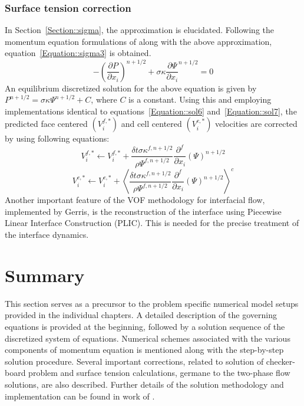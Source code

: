 \subsubsection{Surface tension correction}
In Section~\ref{Section::sigma}, the \citet{brackbill1992continuum} approximation is elucidated. Following the momentum equation formulations of \citet{renardy2002prost,francois2006balanced} along with the above approximation, equation~\ref{Equation::sigma3} is obtained.  
\begin{equation}\label{Equation::sigma3}
-\left(\frac{\partial P}{\partial x_i}\right)^{n+1/2} + \sigma\kappa\frac{\partial\Psi}{\partial x_i}^{n+1/2} = 0
\end{equation}
An equilibrium discretized solution for the above equation is given by $P^{n+1/2} = \sigma\kappa\Psi^{n+1/2} + C$, where $C$ is a constant. Using this and employing implementations identical to equations~\ref{Equation::sol6} and~\ref{Equation::sol7}, the predicted face centered $\left(V_i^{f,*}\right)$ and cell centered $\left(V_i^{c,*}\right)$ velocities are corrected by using following equations: 
\begin{equation}\label{Equation::sigma4}
V_i^{f,*} \leftarrow V_i^{f,*} + \frac{\delta t\sigma\kappa^{f,n+1/2}}{\rho\Psi^{f,n+1/2}}\frac{\partial^f}{\partial x_i}(\Psi)^{n+1/2}
\end{equation}
\begin{equation}\label{Equation::sigma5}
V_i^{c,*} \leftarrow V_i^{c,*} + \left\langle\frac{\delta t\sigma\kappa^{f,n+1/2}}{\rho\Psi^{f,n+1/2}}\frac{\partial^f}{\partial x_i}(\Psi)^{n+1/2}\right\rangle^c
\end{equation}
Another important feature of the VOF methodology for interfacial flow, implemented by Gerris, is the reconstruction of the interface using Piecewise Linear Interface Construction (PLIC). This is needed for the precise treatment of the interface dynamics.
\section{Summary}
This section serves as a precursor to the problem specific numerical model setups provided in the individual chapters. A detailed description of the governing equations is provided at the beginning, followed by a solution sequence of the discretized system of equations. Numerical schemes associated with the various components of momentum equation is mentioned along with the step-by-step solution procedure. Several important corrections, related to solution of checker-board problem and surface tension calculations, germane to the two-phase flow solutions, are also described. Further details of the solution methodology and implementation can be found in work of \citet{Popinet2003,popinet2009}.

